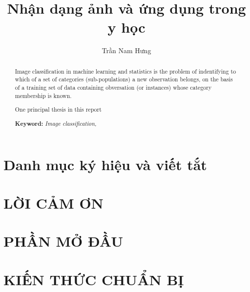 \documentclass[a4paper,oneside]{report}			%
\title{Nhận dạng ảnh và ứng dụng trong y học}
\author{Trần Nam Hưng}
\theoremstyle{plain} %
\theoremstyle{plain} %
\theoremstyle{nonumberplain} %
\begin{document}


%
%
%

\begin{abstract}
	Image classification in machine learning and statistics is the problem of indentifying to which of a set of categories (sub-populations) a new observation belongs, on the basis of a training set of data containing obversation (or instances) whose category membership is known.
	
	One principal thesis in this report 

	\textbf{Keyword:} \textit{Image classification,}
\end{abstract}


\tableofcontents			%
\listoffigures				%
\listoftables				%
\listofalgorithms


\chapter*{Danh mục ký hiệu và viết tắt}

\clearpage

\chapter*{LỜI CẢM ƠN}



%

\chapter*{PHẦN MỞ ĐẦU}


	
\chapter{KIẾN THỨC CHUẨN BỊ}
\setcounter{page}{1}			%
\end{document}

